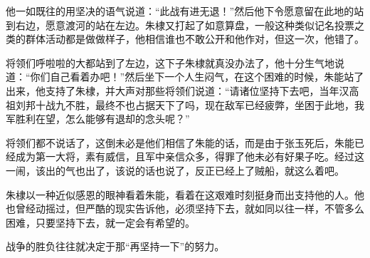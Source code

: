 \begin{multicols}{\theparacolNo}
		他一如既往的用坚决的语气说道：“此战有进无退！”然后他下令愿意留在此地的站到右边，愿意渡河的站在左边。朱棣又打起了如意算盘，一般这种类似记名投票之类的群体活动都是做做样子，他相信谁也不敢公开和他作对，但这一次，他错了。

		将领们呼啦啦的大都站到了左边，这下子朱棣就真没办法了，他十分生气地说道：“你们自己看着办吧！”然后坐下一个人生闷气，在这个困难的时候，朱能站了出来，他支持了朱棣，并大声对那些将领们说道：“请诸位坚持下去吧，当年汉高祖刘邦十战九不胜，最终不也占据天下了吗，现在敌军已经疲弊，坐困于此地，我军胜利在望，怎么能够有退却的念头呢？”

		将领们都不说话了，这倒未必是他们相信了朱能的话，而是由于张玉死后，朱能已经成为第一大将，素有威信，且军中亲信众多，得罪了他未必有好果子吃。经过这一闹，该出的气也出了，该说的话也说了，反正已经上了贼船，就这么着吧。

		朱棣以一种近似感恩的眼神看着朱能，看着在这艰难时刻挺身而出支持他的人。他也曾经动摇过，但严酷的现实告诉他，必须坚持下去，就如同以往一样，不管多么困难，只要坚持下去，就一定会有希望的。

		战争的胜负往往就决定于那“再坚持一下”的努力。
		\ifnum{}
	\end{multicols}
\fi
\newpage

